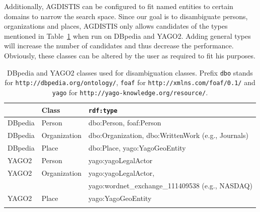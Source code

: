 \documentclass{llncs}
\begin{document}
Additionally, AGDISTIS can be configured to fit named entities to certain domains to narrow the search space.
Since our goal is to disambiguate persons, organizations and places, AGDISTIS only allows candidates of the types mentioned in Table~\ref{tab:tableOfClasses} when run on DBpedia and YAGO2.
Adding general types will increase the number of candidates and thus decrease the performance.
Obviously, these classes can be altered by the user as required to fit his purposes. 

\begin{table}[htb!]
\centering
 \caption{DBpedia  and YAGO2 classes used for disambiguation classes. Prefix \texttt{dbo} stands for \texttt{http://dbpedia.org/ontology/}, \texttt{foaf} for \texttt{http://xmlns.com/foaf/0.1/} and \texttt{yago} for \texttt{http://yago-knowledge.org/resource/}.}
 \begin{tabular}{lll}
	\toprule
\textbf{} & \textbf{Class} & \texttt{\textbf{rdf:type}}\\
\midrule
DBpedia & Person & dbo:Person, foaf:Person\\
DBpedia & Organization & dbo:Organization, dbo:WrittenWork (e.g., Journals) \\
DBpedia & Place & dbo:Place, yago:YagoGeoEntity \\
\midrule
YAGO2 & Person & yago:yagoLegalActor  \\
YAGO2 & Organization & yago:yagoLegalActor, \\
  &   &  yago:wordnet\_exchange\_111409538 (e.g., NASDAQ) \\
YAGO2 & Place & yago:YagoGeoEntity \\
\bottomrule
\label{tab:tableOfClasses}
 \end{tabular}
 \end{table}
\end{document}
